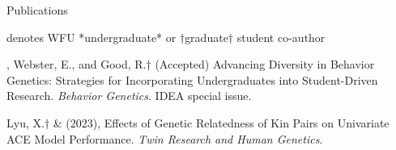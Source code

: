 \begin{rSection}{\textrm{Publications}}%
\vspace{-1mm}\begin{center}\footnotesize{denotes WFU *undergraduate* or $\dagger$graduate$\dagger$ student co-author}\end{center}\vspace{-1mm}
\begin{etaremune}
\item \meb, Webster, E.\noteA, and Good, R.\noteA$\dagger$ (Accepted) Advancing Diversity in Behavior Genetics: Strategies for Incorporating Undergraduates into Student-Driven Research. \textit{Behavior Genetics}. IDEA special issue. \href{10.31234/osf.io/9x7wf}{\small\color{blue}{10.31234/osf.io/9x7wf}} 
\item Lyu, X.$\dagger$ \& \meb (2023), Effects of Genetic Relatedness of Kin Pairs on Univariate ACE Model Performance. \textit{Twin Research and Human Genetics}.  


\end{etaremune}
\end{rSection}
